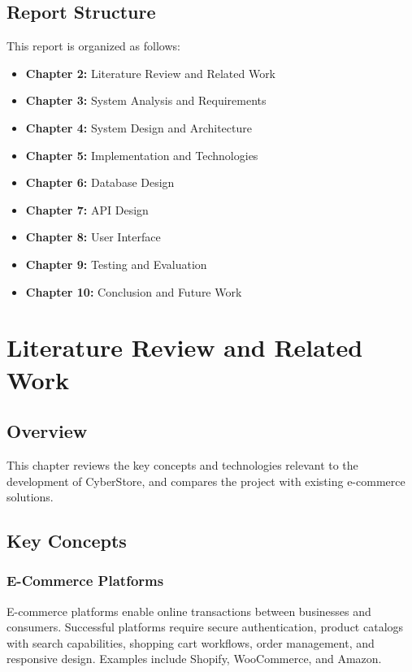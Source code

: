 \documentclass[12pt,a4paper]{report}
\begin{document}
\section{Report Structure}
This report is organized as follows:
\begin{itemize}[noitemsep]
  \item \textbf{Chapter 2:} Literature Review and Related Work
  \item \textbf{Chapter 3:} System Analysis and Requirements
  \item \textbf{Chapter 4:} System Design and Architecture
  \item \textbf{Chapter 5:} Implementation and Technologies
  \item \textbf{Chapter 6:} Database Design
  \item \textbf{Chapter 7:} API Design
  \item \textbf{Chapter 8:} User Interface
  \item \textbf{Chapter 9:} Testing and Evaluation
  \item \textbf{Chapter 10:} Conclusion and Future Work
\end{itemize}


\chapter{Literature Review and Related Work}

\section{Overview}
This chapter reviews the key concepts and technologies relevant to the development of CyberStore, and compares the project with existing e-commerce solutions.

\section{Key Concepts}

\subsection{E-Commerce Platforms}
E-commerce platforms enable online transactions between businesses and consumers. Successful platforms require secure authentication, product catalogs with search capabilities, shopping cart workflows, order management, and responsive design. Examples include Shopify, WooCommerce, and Amazon.
\end{document}
